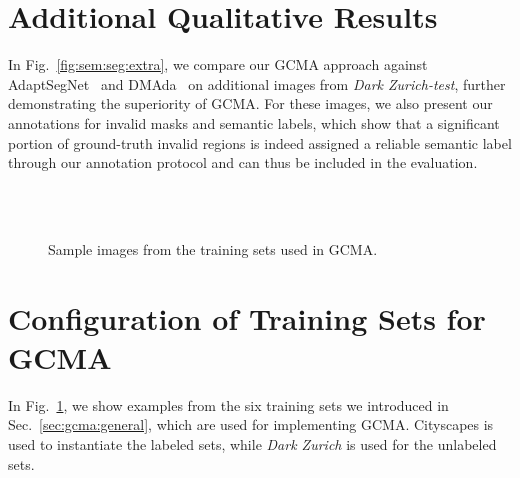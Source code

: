 \documentclass[10pt,twocolumn,letterpaper]{article}
\begin{document}
\section{Additional Qualitative Results}
\label{supp:sec:results}

In Fig.~\ref{fig:sem:seg:extra}, we compare our GCMA approach against AdaptSegNet~\cite{adapt:structured:output:cvpr18} and DMAda~\cite{daytime:2:nighttime} on additional images from \emph{Dark Zurich-test}, further demonstrating the superiority of GCMA. For these images, we also present our annotations for invalid masks and semantic labels, which show that a significant portion of ground-truth invalid regions is indeed assigned a reliable semantic label through our annotation protocol and can thus be included in the evaluation.

\begin{figure}
    \centering
    \hfil
    \\
    \vspace{-0.3cm}
    \hfil
    \\
    \vspace{-0.3cm}
    \hfil
    \caption{Sample images from the training sets used in GCMA.}
    \label{fig:training:datasets}
\end{figure}

\section{Configuration of Training Sets for GCMA}
\label{supp:sec:training:datasets}

In Fig.~\ref{fig:training:datasets}, we show examples from the six training sets we introduced in Sec.~\ref{sec:gcma:general}, which are used for implementing GCMA. Cityscapes is used to instantiate the labeled sets, while \emph{Dark Zurich} is used for the unlabeled sets.
\end{document}
